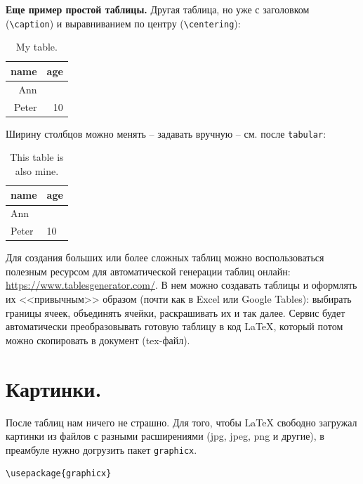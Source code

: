 \documentclass[12pt]{article}
\begin{document}
\textbf{Еще пример простой таблицы.} Другая таблица, но уже с заголовком (\texttt{\textbackslash caption}) и выравниванием по центру (\texttt{\textbackslash centering}): 

\begin{LTXexample}
\begin{table}[ht!]
\caption{My table.}
\centering
\begin{tabular}{|r|r|} 
\hline
name & age \\
\hline
Ann &  \\
Peter & 10 \\
\hline
\end{tabular}
\end{table}
\end{LTXexample}

Ширину столбцов можно менять -- задавать вручную -- см. после \texttt{tabular}:

\begin{LTXexample}
\begin{table}[ht!]
\caption{This table is also mine.}
\centering
\begin{tabular}{|p{2cm}|p{2cm}|} 
\hline
name & age \\
\hline
Ann &  \\
\hline
Peter & 10 \\
\hline
\end{tabular}
\end{table}
\end{LTXexample}

Для создания больших или более сложных таблиц можно воспользоваться полезным ресурсом для автоматической генерации таблиц онлайн: \href{https://www.tablesgenerator.com/}{https://www.tablesgenerator.com/}. В нем можно создавать таблицы и оформлять их <<привычным>> образом (почти как в Excel или Google Tables): выбирать границы ячеек, объединять ячейки, раскрашивать их и так далее. Сервис будет автоматически преобразовывать готовую таблицу в код \LaTeX{}, который потом можно скопировать в документ (tex-файл).

\section{Картинки.}

После таблиц нам ничего не страшно. Для того, чтобы \LaTeX{} свободно загружал картинки из файлов с разными расширениями (jpg, jpeg, png и другие), в преамбуле нужно догрузить пакет \texttt{graphicx}.

\begin{center}
\begin{BVerbatim}
\usepackage{graphicx}
\end{BVerbatim}
\end{center}
\end{document}
